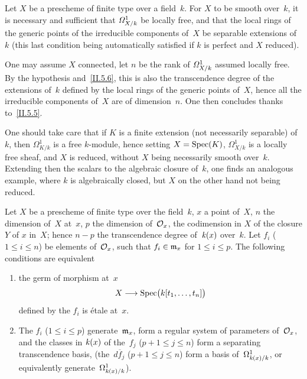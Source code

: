 \begin{corollary}
\label{II.5.7}
Let $X$ be a prescheme of finite type over a
field~$k$. For $X$ to be smooth over~$k$, it is necessary and sufficient that
$\it{\Omega}^1_{X/k}$
be locally free, and that the local rings of the
generic points of the irreducible components of~$X$
be separable extensions of~$k$ (this last
condition being automatically satisfied if $k$ is
perfect and $X$ reduced).
\end{corollary}

One may assume $X$ connected, let $n$ be the rank of
$\it{\Omega}^1_{X/k}$
assumed locally free. By the hypothesis
and~\ref{II.5.6}, this is also the transcendence degree of the
extensions
of~$k$ defined by the local rings of the generic
points of~$X$, hence all the
irreducible components of~$X$ are of dimension~$n$. One then concludes
thanks to~\ref{II.5.5}.

One should take care that if $K$ is a finite extension (not
necessarily separable) of~$k$, then $\Omega^1_{K/k}$ is
a free $k$-module, hence setting $X=\Spec(K)$, $\Omega^1_{X/k}$ is a
locally free sheaf, and $X$ is reduced, without $X$ being
necessarily smooth over~$k$. Extending then the scalars to
the algebraic closure of~$k$, one finds an analogous example,
where $k$ is algebraically closed, but $X$ on the other hand
not being reduced.

\begin{corollary}
\label{II.5.8}
Let $X$ be a prescheme of finite type over the field~$k$, $x$ a
point of~$X$, $n$ the dimension of~$X$ at~$x$, $p$ the dimension
of~$\cal{O}_x$,
\ie the codimension in $X$ of the closure $Y$ of
$x$ in~$X$; hence $n-p$ the transcendence degree
of~$\kres(x)$
over~$k$. Let $f_i$ ($1\leq i\leq n$) be elements
of~$\cal{O}_x$, such that $f_i\in \goth{m}_x$ for $1\leq i\leq p$. The
following conditions are equivalent

\begin{enumerate}
\item[(i)] the germ of morphism at~$x$
\[
X\to \Spec\bigl(k[t_1,\dots,t_n]\bigr)
\]
defined by the $f_i$ is \'etale at~$x$.
\item[(ii)] The $f_i$ ($1\leq i\leq p$)
generate~$\goth{m}_x$,
\ie form a regular system of parameters
of~$\cal{O}_x$, and the classes in
$\kres(x)$ of the~$f_j$ ($p+1\leq j\leq n$) form a separating
transcendence basis, (\ie the~$d\overline{f}_j$ ($p+1\leq j\leq n$) form a basis
of~$\Omega^1_{\kres(x)/k}$, or equivalently generate~$\Omega^1_{\kres(x)/k}$).
\end{enumerate}
\end{corollary}


